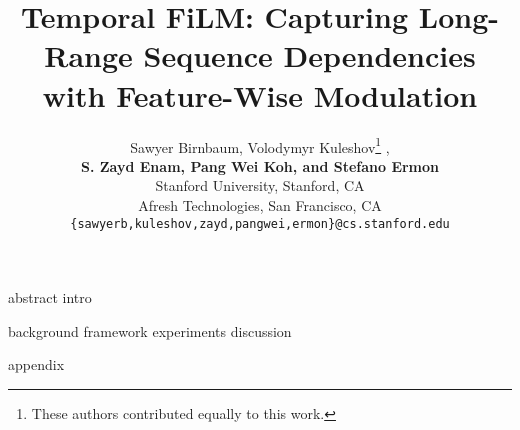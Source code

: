 \documentclass{article}
\title{Temporal FiLM: Capturing Long-Range Sequence Dependencies with Feature-Wise Modulation}
\author{
    Sawyer Birnbaum\footnotemark[1] , Volodymyr Kuleshov\thanks{These authors contributed equally to this work.} , \\
    {\bf S. Zayd Enam, Pang Wei Koh, and Stefano Ermon} \\
    Stanford University, Stanford, CA \\
    Afresh Technologies, San Francisco, CA\\
    \texttt{\{sawyerb,kuleshov,zayd,pangwei,ermon\}@cs.stanford.edu}\\
}
\begin{document}
 

\maketitle

\newcommand{\fix}{\marginpar{FIX}}
\newcommand{\new}{\marginpar{NEW}}

{abstract}
{intro}

{background}
{framework}
{experiments}
{discussion}

\newpage



\appendix

\onecolumn
\newpage

{appendix}
\end{document}

